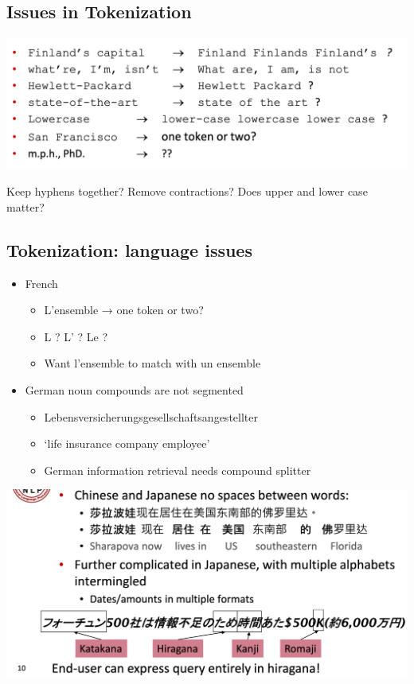 \documentclass[11pt]{article}
\theoremstyle{definition}
\begin{document}
\subsection{Issues in Tokenization}

\includegraphics[width=\textwidth]{2.png}

Keep hyphens together? Remove contractions? Does upper and lower case matter?

\subsection{Tokenization: language issues}
\begin{itemize}
  \item French
  \begin{itemize}
    \item L’ensemble → one token or two?
    \item L ? L’ ? Le ?
    \item Want l’ensemble to match with un ensemble
  \end{itemize}
  \item German noun compounds are not segmented
  \begin{itemize}
    \item Lebensversicherungsgesellschaftsangestellter
    \item ‘life insurance company employee’
    \item German information retrieval needs compound splitter
  \end{itemize}
\end{itemize}

\includegraphics[width=\textwidth]{3.png}
\end{document}
